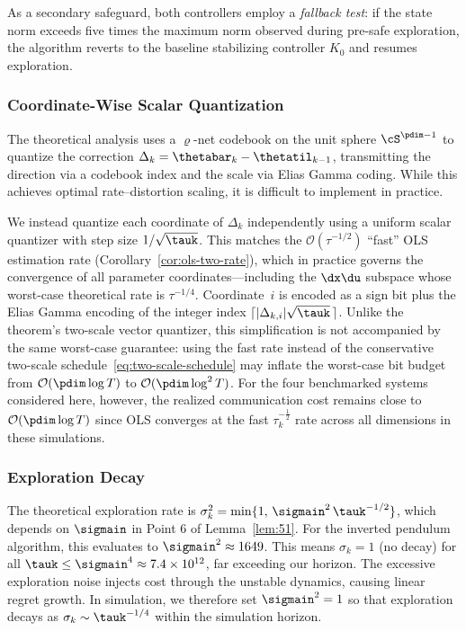 \documentclass[11pt,journal,onecolumn]{IEEEtran}
\begin{document}
As a secondary safeguard, both controllers employ a \emph{fallback test}: if the state norm exceeds five times the maximum norm observed during pre-safe exploration, the algorithm reverts to the baseline stabilizing controller $K_0$ and resumes exploration.

\subsubsection{Coordinate-Wise Scalar Quantization}

The theoretical analysis uses a $\varrho$-net codebook on the unit sphere $\cS^{\pdim-1}$ to quantize the correction $\Delta_k = \thetabar_k - \thetatil_{k-1}$, transmitting the direction via a codebook index and the scale via Elias Gamma coding. While this achieves optimal rate--distortion scaling, it is difficult to implement in practice. 

We instead quantize each coordinate of $\Delta_k$ independently using a uniform scalar quantizer with step size $1/\sqrt{\tauk}$. This matches the $\mathcal{O}(\tau^{-1/2})$ ``fast'' OLS estimation rate (Corollary~\ref{cor:ols-two-rate}), which in practice governs the convergence of all parameter coordinates---including the $\dx\du$ subspace whose worst-case theoretical rate is $\tau^{-1/4}$. Coordinate~$i$ is encoded as a sign bit plus the Elias Gamma encoding of the integer index $\lceil |\Delta_{k,i}|\sqrt{\tauk}\,\rceil$. Unlike the theorem's two-scale vector quantizer, this simplification is not accompanied by the same worst-case guarantee: using the fast rate instead of the conservative two-scale schedule~\eqref{eq:two-scale-schedule} may inflate the worst-case bit budget from $\mathcal{O}(\pdim\log T)$ to $\mathcal{O}(\pdim\log^2 T)$. For the four benchmarked systems considered here, however, the realized communication cost remains close to $\mathcal{O}(\pdim \log T)$ since OLS converges at the fast $\tau_k^{-\frac{1}{2}}$ rate across all dimensions in these simulations.

\subsubsection{Exploration Decay}

The theoretical exploration rate is $\sigma_k^2 = \min\{1,\,\sigmain^2\,\tauk^{-1/2}\}$, which depends on $\sigmain$ in Point 6 of Lemma~\ref{lem:51}.
For the inverted pendulum algorithm, this evaluates to $\sigmain^2 \approx 1649$. This means $\sigma_k = 1$ (no decay) for all $\tauk \le \sigmain^4 \approx 7.4 \times 10^{12}$, far exceeding our horizon. The excessive exploration noise injects cost through the unstable dynamics, causing linear regret growth. In simulation, we therefore set $\sigmain^2 = 1$ so that exploration decays as $\sigma_k \sim \tauk^{-1/4}$ within the simulation horizon.
\end{document}
